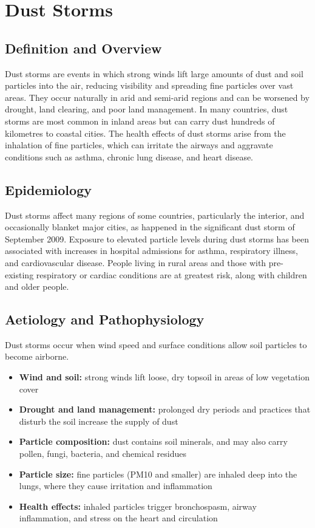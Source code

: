 \chapter{Dust Storms}

\section*{Definition and Overview}
Dust storms are events in which strong winds lift large amounts of dust and soil particles into the air, reducing visibility and spreading fine particles over vast areas. They occur naturally in arid and semi-arid regions and can be worsened by drought, land clearing, and poor land management. In many countries, dust storms are most common in inland areas but can carry dust hundreds of kilometres to coastal cities. The health effects of dust storms arise from the inhalation of fine particles, which can irritate the airways and aggravate conditions such as asthma, chronic lung disease, and heart disease.

\section*{Epidemiology}
Dust storms affect many regions of some countries, particularly the interior, and occasionally blanket major cities, as happened in the significant dust storm of September 2009. Exposure to elevated particle levels during dust storms has been associated with increases in hospital admissions for asthma, respiratory illness, and cardiovascular disease. People living in rural areas and those with pre-existing respiratory or cardiac conditions are at greatest risk, along with children and older people.

\section*{Aetiology and Pathophysiology}
Dust storms occur when wind speed and surface conditions allow soil particles to become airborne.
\begin{itemize}
    \item \textbf{Wind and soil:} strong winds lift loose, dry topsoil in areas of low vegetation cover
    \item \textbf{Drought and land management:} prolonged dry periods and practices that disturb the soil increase the supply of dust
    \item \textbf{Particle composition:} dust contains soil minerals, and may also carry pollen, fungi, bacteria, and chemical residues
    \item \textbf{Particle size:} fine particles (PM10 and smaller) are inhaled deep into the lungs, where they cause irritation and inflammation
    \item \textbf{Health effects:} inhaled particles trigger bronchospasm, airway inflammation, and stress on the heart and circulation
\end{itemize}

